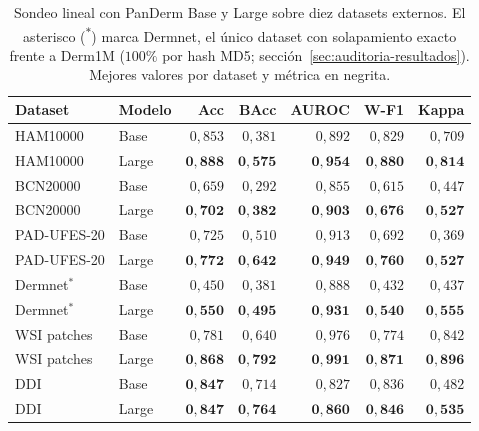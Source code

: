 \begin{table}[H]
\centering
\footnotesize
\setlength{\tabcolsep}{4pt}
\renewcommand{\arraystretch}{0.95}
\caption{Sondeo lineal con PanDerm Base y Large sobre diez datasets
externos. El asterisco (\textsuperscript{$\ast$}) marca Dermnet, el
único dataset con solapamiento exacto frente a Derm1M ($100\%$ por
hash MD5; sección~\ref{sec:auditoria-resultados}).
Mejores valores por dataset y métrica en negrita.}
\label{tab:lp-panderm}
\begin{tabular}{llrrrrr}
\hline
Dataset       & Modelo & Acc            & BAcc           & AUROC          & W-F1           & Kappa \\
\hline
HAM10000      & Base   & $0{,}853$      & $0{,}381$      & $0{,}892$      & $0{,}829$      & $0{,}709$ \\
HAM10000      & Large  & $\mathbf{0{,}888}$ & $\mathbf{0{,}575}$ & $\mathbf{0{,}954}$ & $\mathbf{0{,}880}$ & $\mathbf{0{,}814}$ \\
BCN20000      & Base   & $0{,}659$      & $0{,}292$      & $0{,}855$      & $0{,}615$      & $0{,}447$ \\
BCN20000      & Large  & $\mathbf{0{,}702}$ & $\mathbf{0{,}382}$ & $\mathbf{0{,}903}$ & $\mathbf{0{,}676}$ & $\mathbf{0{,}527}$ \\
PAD-UFES-20   & Base   & $0{,}725$      & $0{,}510$      & $0{,}913$      & $0{,}692$      & $0{,}369$ \\
PAD-UFES-20   & Large  & $\mathbf{0{,}772}$ & $\mathbf{0{,}642}$ & $\mathbf{0{,}949}$ & $\mathbf{0{,}760}$ & $\mathbf{0{,}527}$ \\
Dermnet$^\ast$& Base   & $0{,}450$      & $0{,}381$      & $0{,}888$      & $0{,}432$      & $0{,}437$ \\
Dermnet$^\ast$& Large  & $\mathbf{0{,}550}$ & $\mathbf{0{,}495}$ & $\mathbf{0{,}931}$ & $\mathbf{0{,}540}$ & $\mathbf{0{,}555}$ \\
WSI patches   & Base   & $0{,}781$      & $0{,}640$      & $0{,}976$      & $0{,}774$      & $0{,}842$ \\
WSI patches   & Large  & $\mathbf{0{,}868}$ & $\mathbf{0{,}792}$ & $\mathbf{0{,}991}$ & $\mathbf{0{,}871}$ & $\mathbf{0{,}896}$ \\
DDI           & Base   & $\mathbf{0{,}847}$ & $0{,}714$      & $0{,}827$      & $0{,}836$      & $0{,}482$ \\
DDI           & Large  & $\mathbf{0{,}847}$ & $\mathbf{0{,}764}$ & $\mathbf{0{,}860}$ & $\mathbf{0{,}846}$ & $\mathbf{0{,}535}$ \\

\end{tabular}
\end{table}
